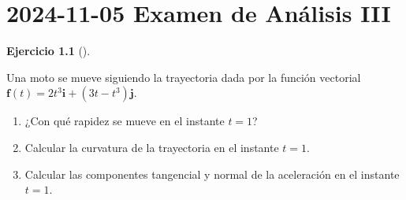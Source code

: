 \documentclass[
  a4paper,
]{scrreport}
\theoremstyle{definition}
\newtheorem{exercise}{Ejercicio}[chapter]
\theoremstyle{remark}
\begin{document}

\chapter{\texorpdfstring{2024-11-05 Examen de Análisis
III}{2024-11-05  Examen de Análisis III}}\label{examen-de-anuxe1lisis-iii-2}

\begin{exercise}[]\protect\hypertarget{exr-1}{}\label{exr-1}

Una moto se mueve siguiendo la trayectoria dada por la función vectorial
\(\mathbf{f}(t)=2t^3 \mathbf{i} + (3t-t^3) \mathbf{j}\).

\begin{enumerate}
\def\labelenumi{\alph{enumi}.}
\item
  ¿Con qué rapidez se mueve en el instante \(t=1\)?
\item
  Calcular la curvatura de la trayectoria en el instante \(t=1\).
\item
  Calcular las componentes tangencial y normal de la aceleración en el
  instante \(t=1\).
\end{enumerate}

\end{exercise}
\end{document}

